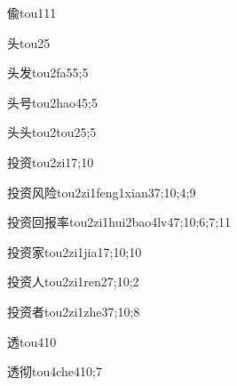 \begin{verbete}{偸}{tou1}{11}
\end{verbete}
\begin{verbete}{头}{tou2}{5}
\end{verbete}
\begin{verbete}{头发}{tou2fa5}{5;5}
\end{verbete}
\begin{verbete}{头号}{tou2hao4}{5;5}
\end{verbete}
\begin{verbete}{头头}{tou2tou2}{5;5}
\end{verbete}
\begin{verbete}{投资}{tou2zi1}{7;10}
\end{verbete}
\begin{verbete}{投资风险}{tou2zi1feng1xian3}{7;10;4;9}
\end{verbete}
\begin{verbete}{投资回报率}{tou2zi1hui2bao4lv4}{7;10;6;7;11}
\end{verbete}
\begin{verbete}{投资家}{tou2zi1jia1}{7;10;10}
\end{verbete}
\begin{verbete}{投资人}{tou2zi1ren2}{7;10;2}
\end{verbete}
\begin{verbete}{投资者}{tou2zi1zhe3}{7;10;8}
\end{verbete}
\begin{verbete}{透}{tou4}{10}
\end{verbete}
\begin{verbete}{透彻}{tou4che4}{10;7}
\end{verbete}
